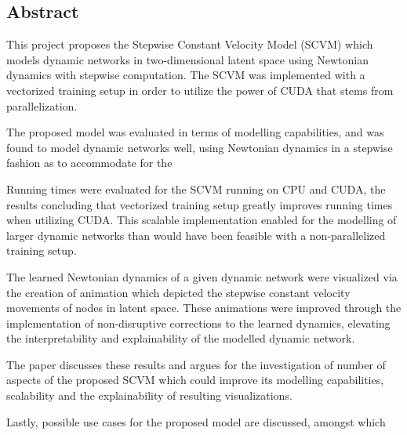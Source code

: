 \subsection*{Abstract}

This project proposes the Stepwise Constant Velocity Model (SCVM) which models dynamic networks in two-dimensional latent space using Newtonian dynamics with stepwise computation.
The SCVM was implemented with a vectorized training setup in order to utilize the power of CUDA that stems from parallelization.

The proposed model was evaluated in terms of modelling capabilities, and was found to model dynamic networks well, using Newtonian dynamics in a stepwise fashion as to accommodate for the 

Running times were evaluated for the SCVM running on CPU and CUDA, the results concluding that vectorized training setup greatly improves running times when utilizing CUDA.
This scalable implementation enabled for the modelling of larger dynamic networks than would have been feasible with a non-parallelized training setup.

The learned Newtonian dynamics of a given dynamic network were visualized via the creation of animation which depicted the stepwise constant velocity movements of nodes in latent space.
These animations were improved through the implementation of non-disruptive corrections to the learned dynamics, elevating the interpretability and explainability of the modelled dynamic network.


The paper discusses these results and argues for the investigation of number of aspects of the proposed SCVM which could improve its modelling capabilities, scalability and the explainability of resulting visualizations.

Lastly, possible use cases for the proposed model are discussed, amongst which 


